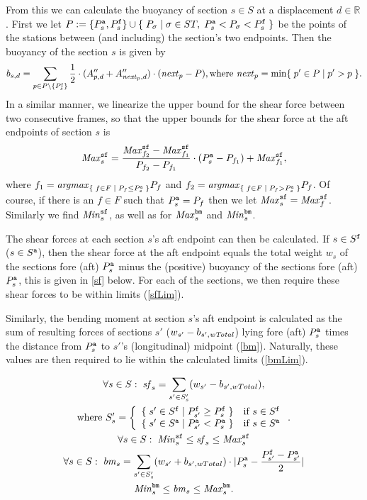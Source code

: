From this we can calculate the buoyancy of section $s \in S$ at a displacement $d\in \mathbb{R}$. First we let $P := \{P^{\texttt{a}}_s, P^{\texttt{f}}_s\} \cup \{\;{P_\sigma}\;|\;{\sigma\in ST,\; P^{\texttt{a}}_s < P_\sigma < P^{\texttt{f}}_s}\;\}$ be the points of the stations between (and including) the section's two endpoints. Then the buoyancy of the section $s$ is given by
\[
b_{s,d} = \sum_{p \in P\setminus \{P^{\texttt{f}}_s\}} \frac{1}{2}\cdot(A''_{p,d}+A''_{\mathit{next}_p,d})\cdot (\mathit{next}_p-P), \text{where } \mathit{next}_p = \min\{\;{p' \in P}\;|\;{p' > p}\;\}.
\]
In a similar manner, we linearize the upper bound for the shear force between two consecutive frames, so that the upper bounds for the shear force at the aft endpoints of section $s$ is
\[
\mathit{Max}^{\texttt{sf}}_s = \frac{\mathit{Max}^{\texttt{sf}}_{f_2}-\mathit{Max}^{\texttt{sf}}_{f_1}}{P_{f_2}-P_{f_1}}\cdot(P^{\texttt{a}}_s - P_{f_1}) + \mathit{Max}^{\texttt{sf}}_{f_1}, 
\]
where $f_1 = \mathit{argmax}_{\{\;{f\in F}\;|\;{P_f\leq P^{\texttt{a}}_s}\;\}}P_f$ and $f_2 = \mathit{argmax}_{\{\;{f\in F}\;|\;{P_f>P^{\texttt{a}}_s}\;\}}P_f$. Of course, if there is an $f\in F$ such that $P^{\texttt{a}}_s = P_f$ then we let $\mathit{Max}^{\texttt{sf}}_s = \mathit{Max}^{\texttt{sf}}_f$. Similarly we find $\mathit{Min}^{\texttt{sf}}_s$, as well as for $\mathit{Max}^{\texttt{bm}}_s$ and $\mathit{Min}^{\texttt{bm}}_s$.   

The shear forces at each section $s$'s aft endpoint can then be calculated. If $s\in S^{\texttt{f}}$ ($s\in S^{\texttt{a}}$), then the shear force at the aft endpoint equals the total weight $w_s$ of the sections fore (aft) $P^{\texttt{a}}_s$ minus the (positive) buoyancy of the sections fore (aft) $P^{\texttt{a}}_s$, this is given in \eqref{sf} below. For each of the sections, we then require these shear forces to be within limits (\ref{sfLim}).   

Similarly, the bending moment at section $s$'s aft endpoint is calculated as the sum of resulting forces of sections $s'$ ($w_{s'} - b_{s', \mathit{wTotal}}$) lying fore (aft) $P^{\texttt{a}}_s$ times the distance from $P^{\texttt{a}}_s$ to $s'$'s (longitudinal) midpoint (\ref{bm}). Naturally, these values are then required to lie within the calculated limits (\ref{bmLim}).

\begin{gather}
\label{sf}
\forall s \in S:\;
\mi{sf}_s = \sum_{s' \in S'_s} (w_{s'} - b_{s',wTotal}),\\
\nonumber \text{where }S'_s = \left\{
\begin{array}{ll} \set{s' \in S^\trt{f}}{P^\trt{f}_{s'} \geq P^\trt{f}_s}&\text{if }s \in S^\trt{f}\\
									\set{s' \in S^\trt{a}}{P^\trt{a}_{s'} < P^\trt{a}_s}&\text{if }s \in S^\trt{a}\end{array}\right..
\\
\label{sfLim}\forall s \in S:\;
\mi{Min}^\trt{sf}_s \leq \mi{sf}_s \leq \mi{Max}^\trt{sf}_s\\
%
\label{bm}\forall s \in S:\;
\mi{bm}_s = 	\sum_{s' \in S'_s} (w_{s'} + b_{s',wTotal})\cdot |P^\trt{a}_s - \frac{P^\trt{f}_{s'}-P^\trt{a}_{s'}}{2}|\\
%
\label{bmLim}
\mi{Min}^\trt{bm}_s \leq \mi{bm}_s \leq \mi{Max}^\trt{bm}_s. 
\end{gather}
%